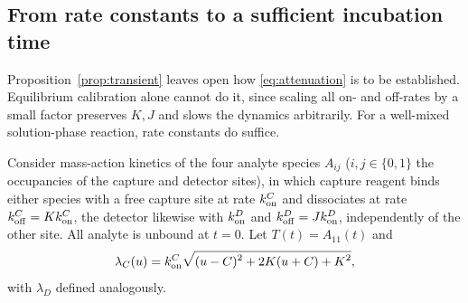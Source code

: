 \documentclass[11pt]{article}
\theoremstyle{plain}
\theoremstyle{definition}
\numberwithin{equation}{section}
\begin{document}
\subsection{From rate constants to a sufficient incubation time}
Proposition~\ref{prop:transient} leaves open how \eqref{eq:attenuation} is to be
established. Equilibrium calibration alone cannot do it, since scaling all on- and
off-rates by a small factor preserves $K,J$ and slows the dynamics arbitrarily. For
a well-mixed solution-phase reaction, rate constants do suffice.

Consider mass-action kinetics of the four analyte species $A_{ij}$
($i,j\in\{0,1\}$ the occupancies of the capture and detector sites), in which
capture reagent binds either species with a free capture site at rate
$k^C_{\rm on}$ and dissociates at rate $k^C_{\rm off}=Kk^C_{\rm on}$, the detector
likewise with $k^D_{\rm on}$ and $k^D_{\rm off}=Jk^D_{\rm on}$, independently of the
other site. All analyte is unbound at $t=0$. Let $T(t)=A_{11}(t)$ and
\begin{equation}\label{eq:lambda}
 \lambda_C(u)=k^C_{\rm on}\sqrt{\smash[b]{(u-C)^2+2K(u+C)+K^2}},
\end{equation}
with $\lambda_D$ defined analogously.
\end{document}
